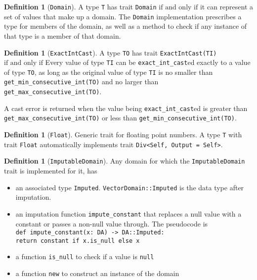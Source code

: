 \documentclass[11pt,a4paper]{article}
\theoremstyle{definition}
\newtheorem{definition}[theorem]{Definition}
\newcommand{\iffText}{\text{if and only if}}
\begin{document}
\begin{definition}[\texttt{Domain}]
\label{defn:traits-domain}
A type \texttt{T} has trait \texttt{Domain} $\iffText$ it can represent a set of values that make up a domain. The \texttt{Domain} implementation prescribes a type for members of the domain, as well as a method to check if any instance of that type is a member of that domain.
\end{definition}

\begin{definition}[\texttt{ExactIntCast}]
    A type \texttt{TO} has trait \texttt{ExactIntCast(TI)} $\iffText$ Every value of type \texttt{TI} can be \texttt{exact\_int\_cast}ed exactly to a value of type \texttt{TO}, as long as the original value of type \texttt{TI} is no smaller than \texttt{get\_min\_consecutive\_int(TO)} and no larger than \texttt{get\_max\_consecutive\_int(TO)}.
    
    A cast error is returned when the value being \texttt{exact\_int\_cast}ed is greater than \texttt{get\_max\_consecutive\_int(TO)} or less than \texttt{get\_min\_consecutive\_int(TO)}.
\end{definition}

\begin{definition}[\texttt{Float}]
    Generic trait for floating point numbers. A type \texttt{T} with trait \texttt{Float} automatically implements trait \texttt{Div<Self, Output = Self>}.
\end{definition}

\begin{definition}[\texttt{ImputableDomain}] 
Any domain for which the \texttt{ImputableDomain} trait is implemented for it, has 
\begin{itemize}
    \item an associated type \texttt{Imputed}. \texttt{VectorDomain::Imputed} is the data type after imputation. 
    \item an imputation function \texttt{impute\_constant} that replaces a null value with a constant or passes a non-null value through. The pseudocode is \\
    \texttt{def impute\_constant(x: DA) -> DA::Imputed: \\ return constant if x.is\_null else x}
    \item  a function \texttt{is\_null} to check if a value is \texttt{null}
    \item a function \texttt{new} to construct an instance of the domain
\end{itemize}

\end{definition}
\end{document}
